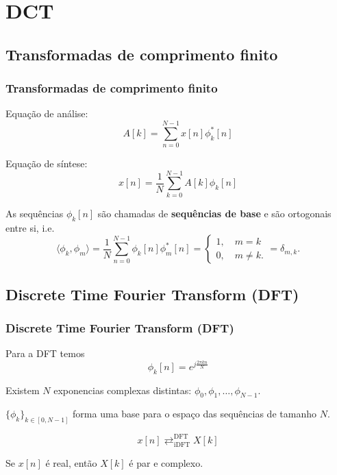 \section{DCT}

\subsection{Transformadas de comprimento finito}

\begin{frame}%
  \frametitle{Transformadas de comprimento finito}
  Equação de análise:
  \begin{equation}
  A[k] = \sum_{n=0}^{N-1} x[n] \phi^{\ast}_{k} [n]
  \end{equation}

  Equação de síntese:
  \begin{equation}
  x[n] = \frac{1}{N} \sum_{k=0}^{N-1} A[k] \phi_k[n]
  \end{equation}

  As sequências $\phi_k [n]$ são chamadas de \textbf{sequências de base} e são ortogonais entre si, i.e.
  \begin{equation}
  \langle \phi_k , \phi_m \rangle = \frac{1}{N} \sum_{n=0}^{N-1} \phi_k [n] \phi^{\ast}_m [n] = \begin{cases} 1, \quad m=k \\ 0, \quad m \neq k .\end{cases} = \delta_{m,k}.
  \end{equation}
\end{frame}


\subsection{Discrete Time Fourier Transform (DFT)}
\begin{frame}%
  \frametitle{Discrete Time Fourier Transform (DFT)}
  Para a DFT temos
  \begin{equation}
   \phi_k [n] = e^{j \frac{2 \pi kn}{N}}
  \end{equation}

  Existem $N$ exponencias complexas distintas: $\phi_0, \phi_1, \ldots, \phi_{N-1}$.

  $\{ \phi_k \}_{k \in [0,N-1]}$ forma uma base para o espaço das sequências de tamanho $N$.

  \begin{equation}
  x[n] \mathrel{\mathop{\rightleftarrows}^{\mathrm{DFT}}_{\mathrm{iDFT}}} X[k]
  \end{equation}

  Se $x[n]$ é real, então $X[k]$ é par e complexo.
\end{frame}

